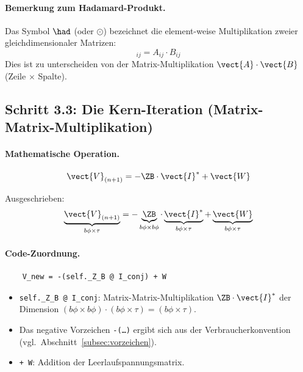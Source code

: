 \paragraph{Bemerkung zum Hadamard-Produkt.} Das Symbol $\had$ (oder $\odot$) bezeichnet die element-weise Multiplikation zweier gleichdimensionaler Matrizen:
\begin{equation}
	[\vect{A} \had \vect{B}]_{ij} = A_{ij} \cdot B_{ij}
	\label{eq:hadamard_def}
\end{equation}
Dies ist zu unterscheiden von der Matrix-Multiplikation $\vect{A} \cdot \vect{B}$ (Zeile $\times$ Spalte).

\subsection{Schritt 3.3: Die Kern-Iteration (Matrix-Matrix-Multiplikation)}
\label{subsec:kern_iteration}

\paragraph{Mathematische Operation.}
\begin{equation}
	\vect{V}_{(n+1)} = -\ZB \cdot \vect{I}^* + \vect{W}
	\label{eq:kern_iteration}
\end{equation}

Ausgeschrieben:
\begin{equation}
	\underbrace{\vect{V}_{(n+1)}}_{b\phi \times \tau} = 
	-\underbrace{\ZB}_{b\phi \times b\phi} \cdot 
	\underbrace{\vect{I}^*}_{b\phi \times \tau} + 
	\underbrace{\vect{W}}_{b\phi \times \tau}
	\label{eq:kern_dimensionen}
\end{equation}

\paragraph{Code-Zuordnung.}
\begin{verbatim}
	V_new = -(self._Z_B @ I_conj) + W
\end{verbatim}

\begin{itemize}
	\item \texttt{self.\_Z\_B @ I\_conj}: Matrix-Matrix-Multiplikation $\ZB \cdot \vect{I}^*$ der Dimension $(b\phi \times b\phi) \cdot (b\phi \times \tau) = (b\phi \times \tau)$.
	\item Das negative Vorzeichen \texttt{-(\ldots)} ergibt sich aus der Verbraucherkonvention (vgl.\ Abschnitt~\ref{subsec:vorzeichen}).
	\item \texttt{+ W}: Addition der Leerlaufspannungsmatrix.
\end{itemize}


